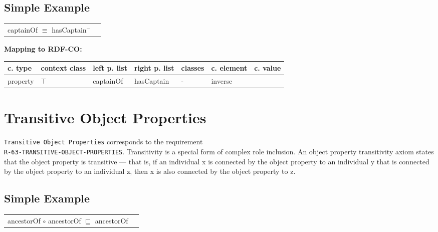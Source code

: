\documentclass{llncs}
\newcommand{\ms}[1]{\texttt{#1}}
\newenvironment{gcotable}{
  \scriptsize
  \sffamily
  \vspace{0cm}
	\begin{center}
	\textbf{\vspace{0.4cm}Mapping to RDF-CO:} \\
  \begin{tabular}{l|l|l|l|l|l|l}
	\hline
  \textbf{c. type} & \textbf{context class} & \textbf{left p. list} & \textbf{right p. list} & \textbf{classes} & \textbf{c. element} & \textbf{c. value} \\
  \hline

}{
  \hline
  \end{tabular}
	\end{center}
}
\newenvironment{DL}{
  \vspace{0cm}
	\begin{center}
  \begin{tabular}{r l}

}{
  \end{tabular}
	\end{center}
}
\begin{document}
%

\subsection{Simple Example}

\begin{DL}
captainOf $\equiv$ hasCaptain$^{-}$ \\
\end{DL}

\begin{gcotable}
property & $\top$ & captainOf & hasCaptain & - & inverse \\
\end{gcotable}

%
%
%

\section{Transitive Object Properties}

\ms{Transitive Object Properties} corresponds to the requirement \\
\ms{R-63-TRANSITIVE-OBJECT-PROPERTIES}.
Transitivity is a special form of complex role inclusion.
An object property transitivity axiom states that the object property is transitive — that is, if an individual x is connected by the object property to an individual y that is connected by the object property to an individual z, then x is also connected by the object property to z.

\subsection{Simple Example}

\begin{DL}
ancestorOf $\circ$ ancestorOf $\sqsubseteq$ ancestorOf
\end{DL}
\end{document}
